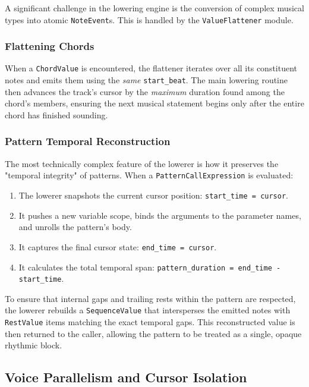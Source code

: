 A significant challenge in the lowering engine is the conversion of complex musical types into atomic \texttt{NoteEvent}s.
This is handled by the \texttt{ValueFlattener} module.

\subsubsection{Flattening Chords}
When a \texttt{ChordValue} is encountered, the flattener iterates over all its constituent notes and emits them using the \textit{same} \texttt{start\_beat}.
The main lowering routine then advances the track's cursor by the \textit{maximum} duration found among the chord's members, ensuring the next musical statement begins only after the entire chord has finished sounding.

\subsubsection{Pattern Temporal Reconstruction}
The most technically complex feature of the lowerer is how it preserves the "temporal integrity" of patterns.
When a \texttt{PatternCallExpression} is evaluated:
\begin{enumerate}
    \item The lowerer snapshots the current cursor position: \texttt{start\_time = cursor}.
    \item It pushes a new variable scope, binds the arguments to the parameter names, and unrolls the pattern's body.
    \item It captures the final cursor state: \texttt{end\_time = cursor}.
    \item It calculates the total temporal span: \texttt{pattern\_duration = end\_time - start\_time}.
\end{enumerate}

To ensure that internal gaps and trailing rests within the pattern are respected, the lowerer rebuilds a \texttt{SequenceValue} that intersperses the emitted notes with \texttt{RestValue} items matching the exact temporal gaps.
This reconstructed value is then returned to the caller, allowing the pattern to be treated as a single, opaque rhythmic block.

\subsection{Voice Parallelism and Cursor Isolation}

